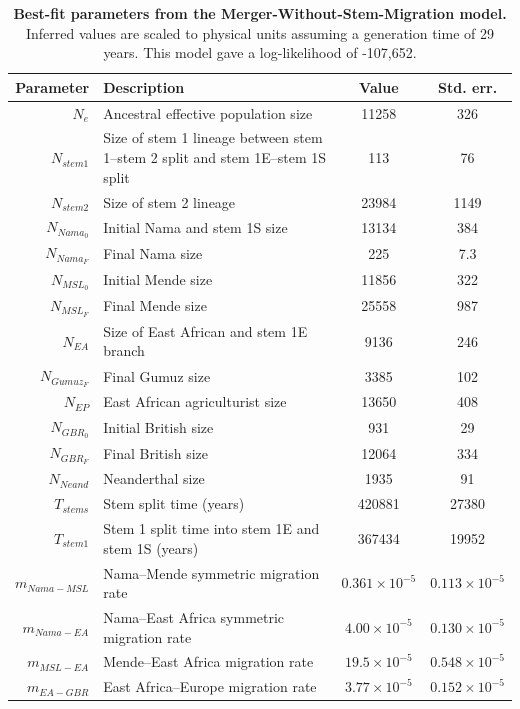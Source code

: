\documentclass[]{article}
\begin{document}
\begin{table}[ht]
\caption{
    \label{tab:supp-merger-without-stem-migration}
    \textbf{Best-fit parameters from the Merger-Without-Stem-Migration model.}
    Inferred values are scaled to physical units assuming a generation time of
    29 years. This model gave a log-likelihood of -107,652.
}
\centering
\begin{tabular}[t]{rP{8cm}cc}
    \toprule
    Parameter & Description & Value & Std. err.\\
    \midrule
    $N_e$ & Ancestral effective population size & 11258 & 326 \\
    $N_{stem1}$ & Size of stem 1 lineage between stem 1--stem 2 split and stem 1E--stem 1S split & 113 & 76 \\
    $N_{stem2}$ & Size of stem 2 lineage & 23984 & 1149 \\
    $N_{Nama_0}$ & Initial Nama and stem 1S size & 13134 & 384 \\
    $N_{Nama_F}$ & Final Nama size & 225 & 7.3 \\
    $N_{MSL_0}$ & Initial Mende size & 11856 & 322 \\
    $N_{MSL_F}$ & Final Mende size & 25558 & 987 \\
    $N_{EA}$ & Size of East African and stem 1E branch & 9136 & 246 \\
    $N_{Gumuz_F}$ & Final Gumuz size & 3385 & 102 \\
    $N_{EP}$ & East African agriculturist size & 13650 & 408 \\
    $N_{GBR_0}$ & Initial British size & 931 & 29 \\
    $N_{GBR_F}$ & Final British size & 12064 & 334 \\
    $N_{Neand}$ & Neanderthal size & 1935 & 91 \\
    $T_{stems}$ & Stem split time (years) & 420881 & 27380 \\
    $T_{stem1}$ & Stem 1 split time into stem 1E and stem 1S (years) & 367434 & 19952 \\
    $m_{Nama-MSL}$ & Nama--Mende symmetric migration rate & $0.361\times10^{-5}$ & $0.113\times10^{-5}$ \\
    $m_{Nama-EA}$ & Nama--East Africa symmetric migration rate & $4.00\times10^{-5}$ & $0.130\times10^{-5}$ \\
    $m_{MSL-EA}$ & Mende--East Africa migration rate & $19.5\times10^{-5}$ & $0.548\times10^{-5}$ \\
    $m_{EA-GBR}$ & East Africa--Europe migration rate & $3.77\times10^{-5}$ & $0.152\times10^{-5}$ \\

\end{tabular}
\end{table}
\end{document}
